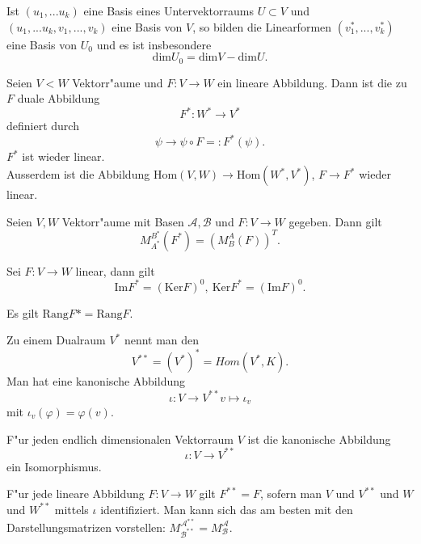 \documentclass[11pt, a4paper]{article}
\begin{document}
\begin{theorem}
Ist $(u_1, ... u_k)$ eine Basis eines Untervektorraums $U \subset V$ und $(u_1, ... u_k, v_1, ..., v_k)$ eine Basis von $V$, so bilden die Linearformen $(v_1^*, ..., v_k^*)$ eine Basis von $U_0$ und es ist insbesondere 
$$
\mathrm{dim} U_0 = \mathrm{dim} V - \mathrm{dim} U.
$$
\end{theorem}
 

\begin{definition}
Seien $V< W$ Vektorr"aume und $F : V \rightarrow W$ ein lineare Abbildung. Dann ist die zu $F$ duale Abbildung
$$
F^* : W^* \rightarrow V^*
$$
definiert durch
$$
\psi \rightarrow \psi \circ F =: F^*(\psi).
$$
$F^*$ ist wieder linear.
\\Ausserdem ist die Abbildung $\mathrm{Hom}(V, W) \rightarrow \mathrm{Hom} (W^*, V^*)$, $F \rightarrow F^*$ wieder linear.
\end{definition}
 
\begin{theorem}
 Seien $V, W$ Vektorr"aume mit Basen $\mathcal{A}, \mathcal{B}$ und $F : V \rightarrow W$ gegeben. Dann gilt
$$
 M^{B^*}_{A^*}(F^*) = \left(M^{A}_B(F)\right)^T.
$$
\end{theorem}

\begin{theorem}
Sei $F : V \rightarrow W$ linear, dann gilt 
$$
\mathrm{Im}F^* = \left( \mathrm{Ker} F \right)^0, \ \mathrm{Ker}F^* = \left( \mathrm{Im} F \right)^0.
$$
\end{theorem}

\begin{corollary}
Es gilt $\mathrm{Rang}F* = \mathrm{Rang}F$.
\end{corollary}

\begin{definition}
Zu einem Dualraum $V^*$ nennt man den 
$$
V ^{**} = (V^*)^* = Hom(V^*, K).
$$
Man hat eine kanonische Abbildung 
$$
\iota : V \rightarrow V^{**}
v \mapsto \iota_v
$$
mit $\iota_v(\varphi) = \varphi (v)$.
\end{definition}

\begin{theorem}
F"ur jeden endlich dimensionalen Vektorraum $V$ ist die kanonische Abbildung
$$
\iota : V \rightarrow V^{**}
$$
ein Isomorphismus.
\end{theorem}

\begin{corollary}
F"ur jede lineare Abbildung $F : V \rightarrow W$ gilt $F^{**} = F$, sofern man $V$ und $V^{**}$ und $W$ und $W^{**}$ mittels $\iota$ identifiziert. Man kann sich das am besten mit den Darstellungsmatrizen vorstellen: $M^{\mathcal{A}^{**}}_{\mathcal{B}^{**}} = M^\mathcal{A}_\mathcal{B}$.
\end{corollary}
\end{document}
